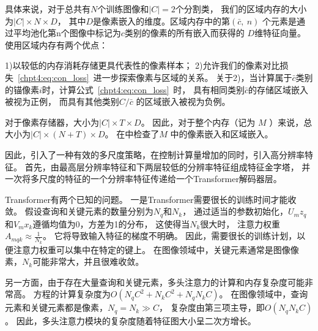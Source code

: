 具体来说，对于总共有$N$个训练图像和$|C|=2$个分割类，
我们的区域内存的大小为$|C|\times N \times D$，
其中$D$是像素嵌入的维度。区域内存中的第$(\bar{c},~n)$
个元素是通过平均池化第n个图像中标记为$c$类别的像素的所有嵌入而获得的
$D$维特征向量。
使用区域内存有两个优点：

1)以较低的内存消耗存储更具代表性的像素样本；
2)允许我们的像素对比损失~\ref{chpt4:eq:con_loss}~进一步探索像素与区域的关系。
关于2)，当计算属于$\bar{c}$类别的锚像素$i$时，计算公式~\ref{chpt4:eq:con_loss}~时，
具有相同类别$\bar{c}$的存储区域嵌入被视为正例，
而具有其他类别$C/ \bar{c}$ 的区域嵌入被视为负例。
% 
% 
% 
% 
\par
对于像素存储器，大小为$|C|\times T \times D$。
因此，对于整个内存（记为 $M$ ）来说，总大小为$|C| \times (N+T) \times D$。
在\todo 中检查了$M$ 中的像素嵌入和区域嵌入。




\todo 
















%
% 

%
%
%
\par
% 
% 
% 
% 

\par

\par
% 
% 
% 
% 

因此，引入了一种有效的多尺度策略，在控制计算量增加的同时，引入高分辨率特征。
首先，由最高层分辨率特征和下两层较低的分辨率特征组成特征金字塔，
并一次将多尺度的特征的一个分辨率特征传递给一个Transformer解码器层。
\par
% 
% 





Transformer有两个已知的问题。
一是Transformer需要很长的训练时间才能收敛。
假设查询和关键元素的数量分别为$N_{q}$和$N_{k}$，
通过适当的参数初始化，$U_{m}z_{q}$和$ V_{m}x_{k}$遵循均值为0，方差为1的分布，
这使得当$N_{k}$很大时，
注意力权重$A_{mqk} \approx \frac{1}{N_{k}} $。
它将导致输入特征的梯度不明确。
因此，需要很长的训练计划，以便注意力权重可以集中在特定的键上。
在图像领域中，关键元素通常是图像像素，$N_{k}$可能非常大，并且很难收敛。
% 
% 
% 
% 
\par
%
% 
% 
% 
另一方面，由于存在大量查询和关键元素，多头注意力的计算和内存复杂度可能非常高。
方程的计算复杂度为$O\left ( N_{q}C^{2} + N_{k}C^{2}+N_{q}N_{k}C \right ) $。
在图像领域中，查询元素和关键元素都是像素，$N_{q}=N_{k} \gg C$，
复杂度由第三项主导，即$O(N_{q}N_{k}C) $。
因此，多头注意力模块的复杂度随着特征图大小呈二次方增长。


